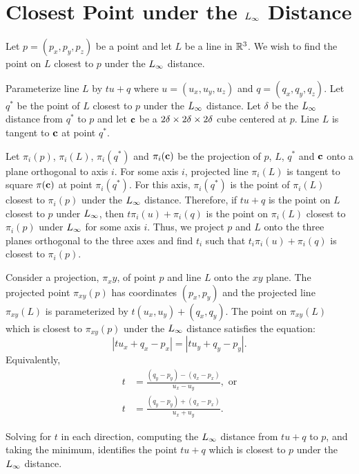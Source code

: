 
\appendix

\section{Closest Point under the $L_\infty$ Distance}
\label{appendix:Linf}

Let $p = (p_x, p_y, p_z)$ be a point and let $L$ be a line in $\mathbb{R}^{3}$.
We wish to find the point on $L$ closest to $p$ under the $L_\infty$ distance.

Parameterize line $L$ by $t u + q$
where $u = (u_x, u_y, u_z)$ and $q = (q_x, q_y, q_z)$.
Let $q^*$ be the point of $L$ closest to $p$ under the $L_\infty$ distance.
Let $\delta$ be the $L_\infty$ distance from $q^*$ to $p$
and let $\mathbf{c}$ be a $2\delta \times 2\delta \times 2\delta$ cube centered at $p$.
Line $L$ is tangent to $\mathbf{c}$ at point $q^*$.

Let $\pi_i(p)$, $\pi_i(L)$, $\pi_i(q^*)$ and $\pi_i(\mathbf{c})$
be the projection of $p$, $L$, $q^*$ and $\mathbf{c}$
onto a plane orthogonal to axis $i$.
For some axis $i$,
projected line $\pi_i(L)$ is tangent to square $\pi(\mathbf{c})$
at point $\pi_i(q^*)$.
For this axis, $\pi_i(q^*)$ is the point of $\pi_i(L)$
closest to $\pi_i(p)$ under the $L_\infty$ distance.
Therefore, if $tu+q$ is the point on $L$ closest to $p$ under $L_\infty$,
then $t \pi_i(u) + \pi_i(q)$ is the point 
on $\pi_i(L)$ closest to $\pi_i(p)$ under $L_\infty$ for some axis $i$.
Thus, we project $p$ and $L$ onto the three planes orthogonal 
to the three axes and find $t_i$ such that $t_i \pi_i(u) + \pi_i(q)$
is closest to $\pi_i(p)$.

Consider a projection, $\pi_xy$, 
of point $p$ and line $L$ onto the $xy$ plane.
The projected point $\pi_{xy}(p)$ has coordinates $(p_x,p_y)$
and the projected line $\pi_{xy}(L)$ is parameterized 
by $t(u_x,u_y) + (q_x,q_y)$.
The point on $\pi_{xy}(L)$ which is closest to $\pi_{xy}(p)$
under the $L_\infty$ distance satisfies the equation:
\begin{equation*}
|t u_x + q_x - p_x| = |t u_y + q_y - p_y|.
\end{equation*}
Equivalently,
\begin{align*}
t & = \frac{(q_y-p_y)-(q_x-p_x)}{u_x-u_y}, \mbox{ or} \\
t & = \frac{(q_y-p_y)+(q_x-p_x)}{u_x+u_y}.
\end{align*}

Solving for $t$ in each direction,
computing the $L_\infty$ distance from $t u + q$ to $p$,
and taking the minimum,
identifies the point $t u + q$ which is closest to $p$
under the $L_\infty$ distance.

